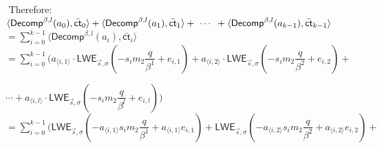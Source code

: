 \begin{myproof}
\begin{enumerate}
$ $
Therefore: \\
$\langle \textsf{Decomp}^{\beta, l}(a_0), \bar{\textsf{ct}}_0 \rangle + \langle \textsf{Decomp}^{\beta, l}(a_1), \bar{\textsf{ct}}_1 \rangle + \text{ } \text{$\cdots$} \text{ } + \langle \textsf{Decomp}^{\beta, l}(a_{k-1}), \bar{\textsf{ct}}_{k-1} \rangle$ \\
$= \sum\limits_{i=0}^{k-1}\langle \textsf{Decomp}^{\beta, l}(a_i), \bar{\textsf{ct}}_i \rangle$ \\
$= \sum\limits_{i=0}^{k-1}\Bigg(a_{\langle i, 1\rangle} \cdot \textsf{LWE}_{\vec{s}, \sigma}\left(-s_im_2\dfrac{q}{\beta^1} + e_{i,1}\right) + a_{\langle i, 2\rangle} \cdot \textsf{LWE}_{\vec{s}, \sigma}\left(-s_im_2\dfrac{q}{\beta^2} + e_{i,2}\right) + $

$ \cdots +  a_{\langle i, l\rangle} \cdot \textsf{LWE}_{\vec{s}, \sigma}\left(-s_im_2\dfrac{q}{\beta^l} + e_{i,l}\right)\Bigg)$ \\
$= \sum\limits_{i=0}^{k-1}\Bigg(\textsf{LWE}_{\vec{s}, \sigma}\left(-a_{\langle i, 1\rangle}s_im_2\dfrac{q}{\beta^1} + a_{\langle i, 1 \rangle}e_{i,1}\right) + \textsf{LWE}_{\vec{s}, \sigma}\left(-a_{\langle i, 2\rangle}s_im_2\dfrac{q}{\beta^2} + a_{\langle i, 2 \rangle}e_{i,2}\right) + $


\end{enumerate}
\end{myproof}
